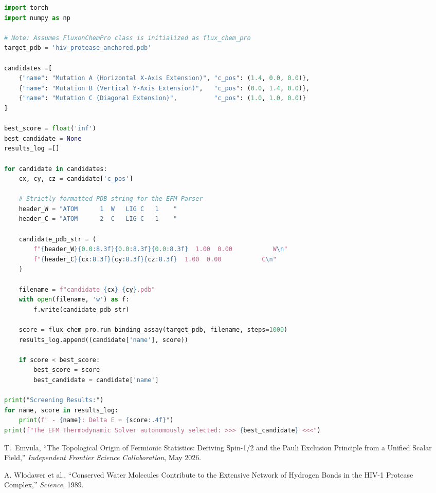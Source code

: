\documentclass[11pt, twoside]{article}
\begin{document}
\begin{lstlisting}[language=Python, caption=EFM Algorithmic Drug Evolution]
import torch
import numpy as np

# Note: Assumes FluxonChemPro class is initialized as flux_chem_pro
target_pdb = 'hiv_protease_anchored.pdb' 

candidates =[
    {"name": "Mutation A (Horizontal X-Axis Extension)", "c_pos": (1.4, 0.0, 0.0)},
    {"name": "Mutation B (Vertical Y-Axis Extension)",   "c_pos": (0.0, 1.4, 0.0)}, 
    {"name": "Mutation C (Diagonal Extension)",          "c_pos": (1.0, 1.0, 0.0)}
]

best_score = float('inf')
best_candidate = None
results_log =[]

for candidate in candidates:
    cx, cy, cz = candidate['c_pos']
    
    # Strictly formatted PDB string for the EFM Parser
    header_W = "ATOM      1  W   LIG C   1    "
    header_C = "ATOM      2  C   LIG C   1    "
    
    candidate_pdb_str = (
        f"{header_W}{0.0:8.3f}{0.0:8.3f}{0.0:8.3f}  1.00  0.00           W\n"
        f"{header_C}{cx:8.3f}{cy:8.3f}{cz:8.3f}  1.00  0.00           C\n"
    )
    
    filename = f"candidate_{cx}_{cy}.pdb"
    with open(filename, 'w') as f:
        f.write(candidate_pdb_str)
        
    score = flux_chem_pro.run_binding_assay(target_pdb, filename, steps=1000)
    results_log.append((candidate['name'], score))
    
    if score < best_score:
        best_score = score
        best_candidate = candidate['name']

print("Screening Results:")
for name, score in results_log:
    print(f" - {name}: Delta E = {score:.4f}")
print(f"The EFM Thermodynamic Solver autonomously selected: >>> {best_candidate} <<<")
\end{lstlisting}


\begin{thebibliography}{2}
\raggedright
{}
T.~Emvula, ``The Topological Origin of Fermionic Statistics: Deriving Spin-1/2 and the Pauli Exclusion Principle from a Unified Scalar Field,'' \textit{Independent Frontier Science Collaboration}, May 2026.

A. Wlodawer et al., ``Conserved Water Molecules Contribute to the Extensive Network of Hydrogen Bonds in the HIV-1 Protease Complex,'' \textit{Science}, 1989.
\end{thebibliography}
\end{document}

